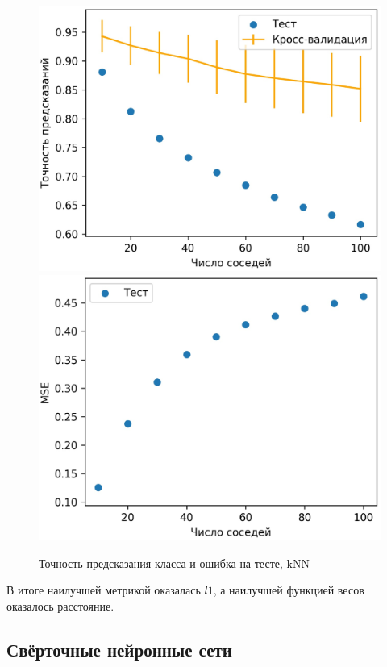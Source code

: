 \documentclass[12pt,twoside]{article}
\begin{document}
\begin{figure}[H]
    \includegraphics[scale=0.15]{charts/knn.eps}
    \includegraphics[scale=0.15]{charts/knn_mse.eps}
    \centering
    \caption{Точность предсказания класса и ошибка на тесте, kNN}
\end{figure}

В итоге наилучшей метрикой оказалась $l1$, а наилучшей функцией весов оказалось расстояние.

\subsection{Свёрточные нейронные сети}
\end{document}
